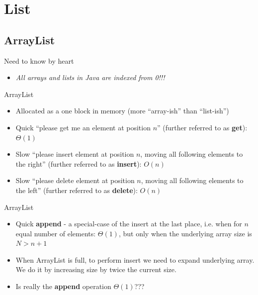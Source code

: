 \documentclass{beamer}
\begin{document}
\section{List}

\subsection{ArrayList}

\begin{frame}{Need to know by heart}

\begin{itemize}
\item \textsl{All arrays and lists in Java are indexed from 0!!!}
\end{itemize}

\end{frame}

\begin{frame}{ArrayList}

\begin{itemize}
\item Allocated as a one block in memory (more ``array-ish'' than ``list-ish'')
\item Quick ``please get me an element at position $n$'' (further referred to as \textbf{get}): $\Theta(1)$
\item Slow ``please insert element at position $n$, moving all following elements to the right'' (further referred to as \textbf{insert}): $O(n)$
\item Slow ``please delete element at position $n$, moving all following elements to the left'' (further referred to as \textbf{delete}): $O(n)$
\end{itemize}

\end{frame}

\begin{frame}{ArrayList}

\begin{itemize}
\item Quick \textbf{append} - a special-case of the insert at the last place, i.e. when for $n$ equal number of elements: $\Theta(1)$, but only when the underlying array size is $N>n+1$
\item When ArrayList is full, to perform insert we need to expand underlying array. We do it by increasing size by twice the current size.
\item Is really the \textbf{append} operation $\Theta(1)$???

\end{itemize}

\end{frame}
\end{document}
